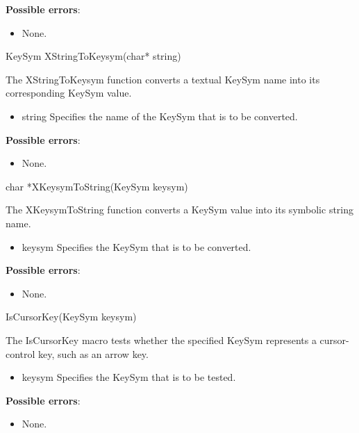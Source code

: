 \documentclass{report}
\begin{document}
\begin{itemize}
        \textbf{Possible errors}:
        \begin{itemize}
            \item None.
        \end{itemize}

        \begin{cppcode}
        KeySym XStringToKeysym(char* string)
        \end{cppcode}
        \bigbreak \noindent
        The XStringToKeysym function converts a textual KeySym name into its corresponding KeySym value.
        \begin{itemize}
            \item string Specifies the name of the KeySym that is to be converted.
        \end{itemize}

        \textbf{Possible errors}:
        \begin{itemize}
            \item None.
        \end{itemize}

        \begin{cppcode}
        char *XKeysymToString(KeySym keysym)
        \end{cppcode}
        \bigbreak \noindent
        The XKeysymToString function converts a KeySym value into its symbolic string name.
        \begin{itemize}
            \item keysym Specifies the KeySym that is to be converted.
        \end{itemize}

        \textbf{Possible errors}:
        \begin{itemize}
            \item None.
        \end{itemize}

        \begin{cppcode}
        IsCursorKey(KeySym keysym)
        \end{cppcode}
        \bigbreak \noindent
        The IsCursorKey macro tests whether the specified KeySym represents a cursor-control key, such as an arrow key.
        \begin{itemize}
            \item keysym Specifies the KeySym that is to be tested.
        \end{itemize}

        \textbf{Possible errors}:
        \begin{itemize}
            \item None.
        \end{itemize}


\end{itemize}
\end{document}
